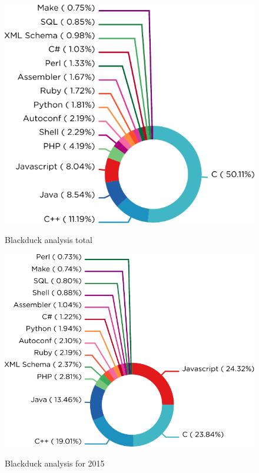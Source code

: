 

\begin{figure}
  \centering
  \begin{minipage}{0.49\textwidth}
    \centering
    \includegraphics[width=\linewidth]{../resources/blackduck-alltime.pdf}
    \label{fig:blackduck-alltime}
    \caption{Blackduck analysis total}
  \end{minipage}
  \hfill
  \begin{minipage}{0.49\textwidth}
    \centering
    \includegraphics[width=\linewidth]{../resources/blackduck-2015.pdf}
    \label{fig:blackduck-2015}
    \caption{Blackduck analysis for 2015}
  \end{minipage}
\end{figure}


